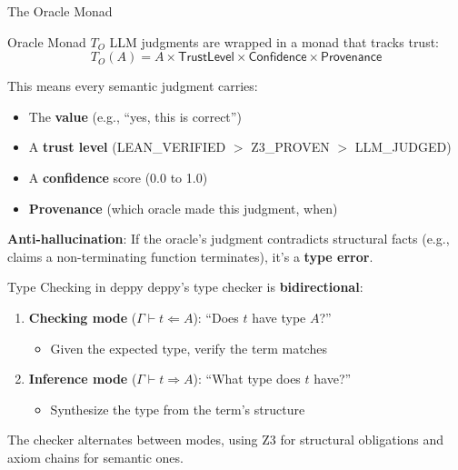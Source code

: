 \documentclass[aspectratio=169,11pt]{beamer}
\begin{document}
\begin{frame}{The Oracle Monad}
\begin{block}{Oracle Monad $T_O$}
LLM judgments are wrapped in a monad that tracks trust:
\[
  T_O(A) = A \times \mathsf{TrustLevel} \times \mathsf{Confidence} \times \mathsf{Provenance}
\]
\end{block}

This means every semantic judgment carries:
\begin{itemize}
\item The \textbf{value} (e.g., ``yes, this is correct'')
\item A \textbf{trust level} (LEAN\_VERIFIED $>$ Z3\_PROVEN $>$ LLM\_JUDGED)
\item A \textbf{confidence} score (0.0 to 1.0)
\item \textbf{Provenance} (which oracle made this judgment, when)
\end{itemize}

\textbf{Anti-hallucination}: If the oracle's judgment contradicts
structural facts (e.g., claims a non-terminating function terminates),
it's a \textbf{type error}.
\end{frame}

\begin{frame}{Type Checking in deppy}
deppy's type checker is \textbf{bidirectional}:

\begin{enumerate}
\item \textbf{Checking mode} ($\Gamma \vdash t \Leftarrow A$):
  ``Does $t$ have type $A$?''
  \begin{itemize}
  \item Given the expected type, verify the term matches
  \end{itemize}

\item \textbf{Inference mode} ($\Gamma \vdash t \Rightarrow A$):
  ``What type does $t$ have?''
  \begin{itemize}
  \item Synthesize the type from the term's structure
  \end{itemize}
\end{enumerate}

\vspace{0.5em}
The checker alternates between modes, using Z3 for structural
obligations and axiom chains for semantic ones.
\end{frame}
\end{document}
